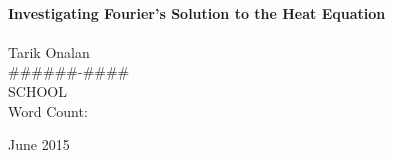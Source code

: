 \begin{titlepage}
    \begin{center}
        \HRule \\[0.4cm]
        { \large \bfseries Investigating Fourier's Solution to the Heat Equation \\[0.4cm] }
        \HRule \\[1.5cm]

        Tarik Onalan
        \\[0.4cm]
        \#\#\#\#\#\#-\#\#\#\#
        \\[0.4cm]
        SCHOOL
        \\[0.4cm]
        Word Count:
        \vfill

        {\large June 2015}
    \end{center}
\end{titlepage}